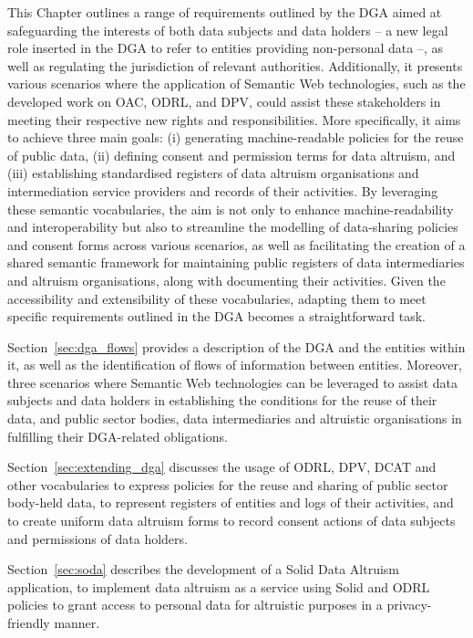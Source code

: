 This Chapter outlines a range of requirements outlined by the DGA aimed at safeguarding the interests of both data subjects and data holders -- a new legal role inserted in the DGA to refer to entities providing non-personal data --, as well as regulating the jurisdiction of relevant authorities. 
Additionally, it presents various scenarios where the application of Semantic Web technologies, such as the developed work on OAC, ODRL, and DPV, could assist these stakeholders in meeting their respective new rights and responsibilities.
More specifically, it aims to achieve three main goals: (i) generating machine-readable policies for the reuse of public data, (ii) defining consent and permission terms for data altruism, and (iii) establishing standardised registers of data altruism organisations and intermediation service providers and records of their activities.
By leveraging these semantic vocabularies, the aim is not only to enhance machine-readability and interoperability but also to streamline the modelling of data-sharing policies and consent forms across various scenarios, as well as facilitating the creation of a shared semantic framework for maintaining public registers of data intermediaries and altruism organisations, along with documenting their activities.
Given the accessibility and extensibility of these vocabularies, adapting them to meet specific requirements outlined in the DGA becomes a straightforward task.

Section~\ref{sec:dga_flows} provides a description of the DGA and the entities within it, as well as the identification of flows of information between entities.
Moreover, three scenarios where Semantic Web technologies can be leveraged to assist data subjects and data holders in establishing the conditions for the reuse of their data, and public sector bodies, data intermediaries and altruistic organisations in fulfilling their DGA-related obligations. 

Section~\ref{sec:extending_dga} discusses the usage of ODRL, DPV, DCAT and  other vocabularies to express policies for the reuse and sharing of public sector body-held data, to represent registers of entities and logs of their activities, and to create uniform data altruism forms to record consent actions of data subjects and permissions of data holders.

Section~\ref{sec:soda} describes the development of a Solid Data Altruism application, to implement data altruism as a service using Solid and ODRL policies to grant access to personal data for altruistic purposes in a privacy-friendly manner.

